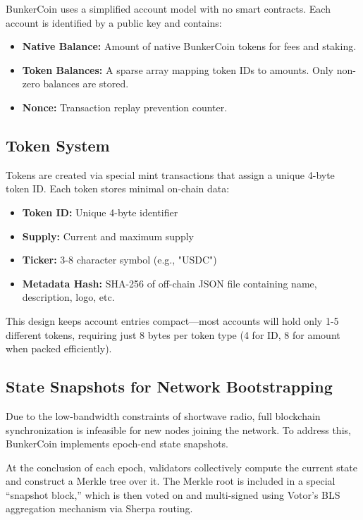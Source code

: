 \documentclass{article}
\begin{document}
BunkerCoin uses a simplified account model with no smart contracts. Each account is identified by a public key and contains:

\begin{itemize}
    \item \textbf{Native Balance:} Amount of native BunkerCoin tokens for fees and staking.
    \item \textbf{Token Balances:} A sparse array mapping token IDs to amounts. Only non-zero balances are stored.
    \item \textbf{Nonce:} Transaction replay prevention counter.
\end{itemize}

\subsection{Token System}
\label{sec:tokens}

Tokens are created via special mint transactions that assign a unique 4-byte token ID. Each token stores minimal on-chain data:

\begin{itemize}
    \item \textbf{Token ID:} Unique 4-byte identifier
    \item \textbf{Supply:} Current and maximum supply
    \item \textbf{Ticker:} 3-8 character symbol (e.g., "USDC")
    \item \textbf{Metadata Hash:} SHA-256 of off-chain JSON file containing name, description, logo, etc.
\end{itemize}

This design keeps account entries compact—most accounts will hold only 1-5 different tokens, requiring just 8 bytes per token type (4 for ID, 8 for amount when packed efficiently).

\subsection{State Snapshots for Network Bootstrapping}

Due to the low-bandwidth constraints of shortwave radio, full blockchain synchronization is infeasible for new nodes joining the network. To address this, BunkerCoin implements epoch-end state snapshots.

At the conclusion of each epoch, validators collectively compute the current state and construct a Merkle tree over it. The Merkle root is included in a special ``snapshot block,'' which is then voted on and multi-signed using Votor's BLS aggregation mechanism via Sherpa routing.
\end{document}
